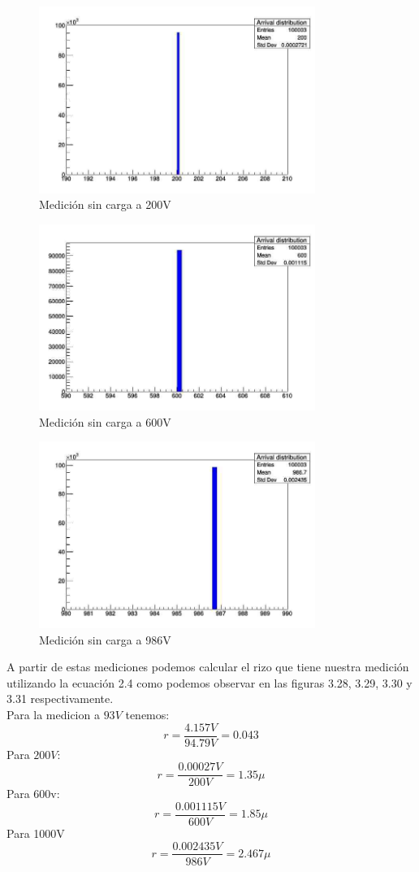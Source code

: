 \begin{figure}[H]
\centering
\includegraphics[width=9cm]{Capitulo3/figs/200V.jpg}
\caption{Medición sin carga a 200V}
\end{figure}

\begin{figure}[H]
\centering
\includegraphics[width=9cm]{Capitulo3/figs/600v.jpg}
\caption{Medición sin carga a 600V}
\end{figure}

\begin{figure}[H]
\centering
\includegraphics[width=9cm]{Capitulo3/figs/986V.jpg}
\caption{Medición sin carga a 986V}
\end{figure}

A partir de estas mediciones podemos calcular el rizo que tiene nuestra medición utilizando la ecuación 2.4 como podemos observar en las figuras 3.28, 3.29, 3.30 y 3.31  respectivamente. \\Para la medicion a $93V$ tenemos: $$r=\frac{4.157V}{94.79V}=0.043$$ Para $200V$: $$r=\frac{0.00027V}{200V}=1.35\mu $$ Para 600v:  $$r=\frac{0.001115V}{600V}=1.85\mu $$ Para 1000V  $$r=\frac{0.002435V}{986V}=2.467\mu $$

